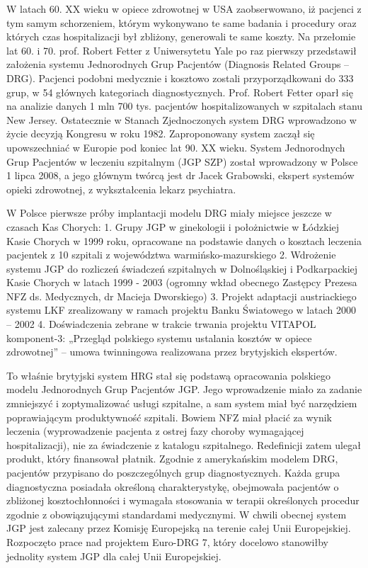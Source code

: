 W latach 60. XX wieku w opiece zdrowotnej w USA zaobserwowano, iż pacjenci z tym samym schorzeniem, którym wykonywano te same badania i procedury oraz których czas hospitalizacji był zbliżony, generowali te same koszty. Na przełomie lat 60. i 70. prof. Robert Fetter z Uniwersytetu Yale po raz pierwszy przedstawił założenia systemu Jednorodnych Grup Pacjentów (Diagnosis Related Groups – DRG). Pacjenci podobni medycznie i kosztowo zostali przyporządkowani do 333 grup, w 54 głównych kategoriach diagnostycznych. Prof. Robert Fetter oparł się na analizie danych 1 mln 700 tys. pacjentów hospitalizowanych w szpitalach stanu New Jersey. Ostatecznie w Stanach Zjednoczonych system DRG wprowadzono w życie decyzją Kongresu w roku 1982. Zaproponowany system zaczął się upowszechniać w Europie pod koniec lat 90. XX wieku.
System Jednorodnych Grup Pacjentów w leczeniu szpitalnym (JGP SZP) został wprowadzony w Polsce 1 lipca 2008, a jego głównym twórcą jest dr Jacek Grabowski, ekspert systemów opieki zdrowotnej, z wykształcenia lekarz psychiatra.

W Polsce pierwsze próby implantacji modelu DRG miały miejsce jeszcze w czasach Kas Chorych:
1. Grupy JGP w ginekologii i położnictwie w Łódzkiej Kasie Chorych w 1999 roku, opracowane na podstawie danych o kosztach leczenia pacjentek z 10 szpitali z województwa warmińsko-mazurskiego
2. Wdrożenie systemu JGP do rozliczeń świadczeń szpitalnych w Dolnośląskiej i Podkarpackiej Kasie Chorych w latach 1999 - 2003 (ogromny wkład obecnego Zastępcy Prezesa NFZ ds. Medycznych, dr Macieja Dworskiego)
3. Projekt adaptacji austriackiego systemu LKF zrealizowany w ramach projektu Banku Światowego w latach 2000 – 2002 4. Doświadczenia zebrane w trakcie trwania projektu VITAPOL komponent-3: „Przegląd polskiego systemu ustalania kosztów w opiece zdrowotnej” – umowa twinningowa realizowana przez brytyjskich ekspertów.

To właśnie brytyjski system HRG stał się podstawą opracowania polskiego modelu Jednorodnych Grup Pacjentów JGP. Jego wprowadzenie miało za zadanie zmniejszyć i zoptymalizować usługi szpitalne, a sam system miał być narzędziem poprawiającym produktywność szpitali. Bowiem NFZ miał płacić za wynik leczenia (wyprowadzenie pacjenta z ostrej fazy choroby wymagającej hospitalizacji), nie za świadczenie z katalogu szpitalnego. Redefinicji zatem ulegał produkt, który finansował płatnik. Zgodnie z amerykańskim modelem DRG, pacjentów przypisano do poszczególnych grup diagnostycznych. Każda grupa diagnostyczna posiadała określoną charakterystykę, obejmowała pacjentów o zbliżonej kosztochłonności i wymagała stosowania w terapii określonych procedur zgodnie z obowiązującymi standardami medycznymi. W chwili obecnej system JGP jest zalecany przez Komisję Europejską na terenie całej Unii Europejskiej. Rozpoczęto prace nad projektem Euro-DRG 7, który docelowo stanowiłby jednolity system JGP dla całej Unii Europejskiej.

